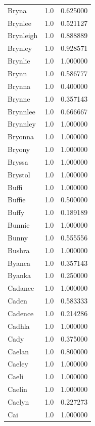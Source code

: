 \documentclass[
  letterpaper,
  DIV=11,
  numbers=noendperiod]{scrreprt}
\begin{document}
\begin{tabular}{lrr}
Bryna           &   1.0 &   0.625000 \\
Brynlee         &   1.0 &   0.521127 \\
Brynleigh       &   1.0 &   0.888889 \\
Brynley         &   1.0 &   0.928571 \\
Brynlie         &   1.0 &   1.000000 \\
Brynn           &   1.0 &   0.586777 \\
Brynna          &   1.0 &   0.400000 \\
Brynne          &   1.0 &   0.357143 \\
Brynnlee        &   1.0 &   0.666667 \\
Brynnley        &   1.0 &   1.000000 \\
Bryonna         &   1.0 &   1.000000 \\
Bryony          &   1.0 &   1.000000 \\
Bryssa          &   1.0 &   1.000000 \\
Brystol         &   1.0 &   1.000000 \\
Buffi           &   1.0 &   1.000000 \\
Buffie          &   1.0 &   0.500000 \\
Buffy           &   1.0 &   0.189189 \\
Bunnie          &   1.0 &   1.000000 \\
Bunny           &   1.0 &   0.555556 \\
Bushra          &   1.0 &   1.000000 \\
Byanca          &   1.0 &   0.357143 \\
Byanka          &   1.0 &   0.250000 \\
Cadance         &   1.0 &   1.000000 \\
Caden           &   1.0 &   0.583333 \\
Cadence         &   1.0 &   0.214286 \\
Cadhla          &   1.0 &   1.000000 \\
Cady            &   1.0 &   0.375000 \\
Caelan          &   1.0 &   0.800000 \\
Caeley          &   1.0 &   1.000000 \\
Caeli           &   1.0 &   1.000000 \\
Caelin          &   1.0 &   1.000000 \\
Caelyn          &   1.0 &   0.227273 \\
Cai             &   1.0 &   1.000000 \\

\end{tabular}
\end{document}
